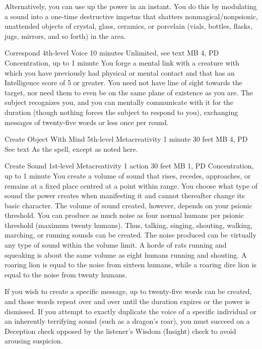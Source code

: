 Alternatively, you can use up the power in an instant.
You do this by modulating a sound into a one-time
destructive impetus that shatters nonmagical/nonpsionic,
unattended objects of crystal, glass, ceramics, or porcelain
(vials, bottles, flasks, jugs, mirrors, and so forth)
in the area.

\DndPowerHeader%
  {Correspond}
  {4th-level Voice}
  {10 minutes}
  {Unlimited, see text}
  {MB 4, PD \lvlfour}
  {Concentration, up to 1 minute}
You forge a mental link with a creature with which you have
previously had physical or mental contact
and that has an Intelligence score of 5 or greater.
You need not have line of sight towards the target,
nor need them to even be on the same
plane of existence as you are.
The subject recognizes you, and you can mentally communicate
with it for the duration
(though nothing forces the subject to respond to you),
exchanging messages of twenty-five words or less once per round.

\DndPowerHeader%
  {Create Object With Mind}
  {5th-level Metacreativity}
  {1 minute}
  {30 feet}
  {MB 4, PD \lvlfive}
  {See text}
As the  spell,
except as noted here.

\DndPowerHeader%
  {Create Sound}
  {1st-level Metacreativity}
  {1 action}
  {30 feet}
  {MB 1, PD \lvlone}
  {Concentration, up to 1 minute}
You create a volume of sound that rises, recedes, approaches,
or remains at a fixed place centred at a point within range.
You choose what type of sound
the power creates when manifesting it
and cannot thereafter change its basic character.
The volume of sound created,
however, depends on your psionic threshold.
You can produce as much noise as
four normal humans per psionic threshold (maximum twenty humans).
Thus, talking, singing, shouting, walking,
marching, or running sounds can be created.
The noise produced can be virtually any type of sound
within the volume limit.
A horde of rats running and squeaking
is about the same volume as eight humans running and shouting.
A roaring lion is equal to the noise from sixteen humans,
while a roaring dire lion is equal to the noise from twenty humans.

If you wish to create a specific message,
up to twenty-five words can be created,
and those words repeat over and over
until the duration expires or the power is dismissed.
If you attempt to exactly duplicate the voice
of a specific individual or an inherently terrifying sound
(such as a dragon's roar),
you must succeed on a Deception check opposed
by the listener's Wisdom (Insight) check
to avoid arousing suspicion.


